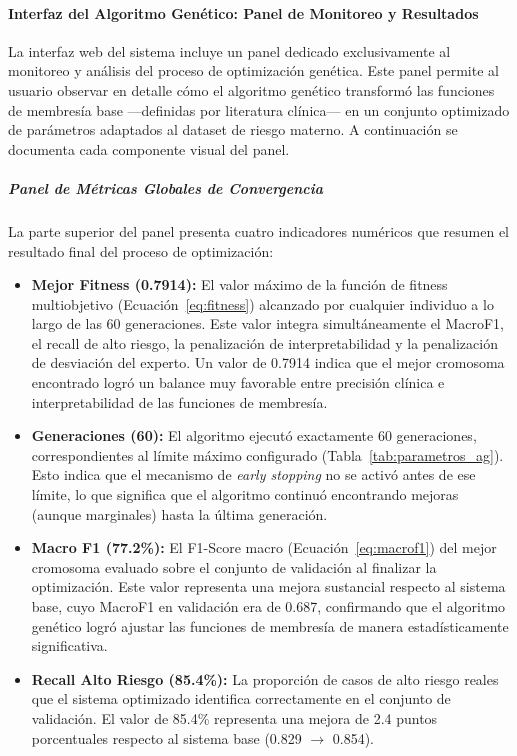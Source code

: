 \documentclass[11pt]{article}
\begin{document}
\paragraph{Interfaz del Algoritmo Gen\'etico: Panel de Monitoreo y Resultados}

La interfaz web del sistema incluye un panel dedicado exclusivamente al monitoreo y an\'alisis del proceso de optimizaci\'on gen\'etica. Este panel permite al usuario observar en detalle c\'omo el algoritmo gen\'etico transform\'o las funciones de membres\'ia base ---definidas por literatura cl\'inica--- en un conjunto optimizado de par\'ametros adaptados al dataset de riesgo materno. A continuaci\'on se documenta cada componente visual del panel.

\subparagraph{Panel de M\'etricas Globales de Convergencia}

La parte superior del panel presenta cuatro indicadores num\'ericos que resumen el resultado final del proceso de optimizaci\'on:

\begin{itemize}
    \item \textbf{Mejor Fitness (0.7914):} El valor m\'aximo de la funci\'on de fitness multiobjetivo (Ecuaci\'on~\ref{eq:fitness}) alcanzado por cualquier individuo a lo largo de las 60 generaciones. Este valor integra simult\'aneamente el MacroF1, el recall de alto riesgo, la penalizaci\'on de interpretabilidad y la penalizaci\'on de desviaci\'on del experto. Un valor de 0.7914 indica que el mejor cromosoma encontrado logr\'o un balance muy favorable entre precisi\'on cl\'inica e interpretabilidad de las funciones de membres\'ia.

    \item \textbf{Generaciones (60):} El algoritmo ejecut\'o exactamente 60 generaciones, correspondientes al l\'imite m\'aximo configurado (Tabla~\ref{tab:parametros_ag}). Esto indica que el mecanismo de \textit{early stopping} no se activ\'o antes de ese l\'imite, lo que significa que el algoritmo continu\'o encontrando mejoras (aunque marginales) hasta la \'ultima generaci\'on.

    \item \textbf{Macro F1 (77.2\%):} El F1-Score macro (Ecuaci\'on~\ref{eq:macrof1}) del mejor cromosoma evaluado sobre el conjunto de validaci\'on al finalizar la optimizaci\'on. Este valor representa una mejora sustancial respecto al sistema base, cuyo MacroF1 en validaci\'on era de 0.687, confirmando que el algoritmo gen\'etico logr\'o ajustar las funciones de membres\'ia de manera estad\'isticamente significativa.

    \item \textbf{Recall Alto Riesgo (85.4\%):} La proporci\'on de casos de alto riesgo reales que el sistema optimizado identifica correctamente en el conjunto de validaci\'on. El valor de 85.4\% representa una mejora de 2.4 puntos porcentuales respecto al sistema base (0.829 $\rightarrow$ 0.854).
\end{itemize}
\end{document}
